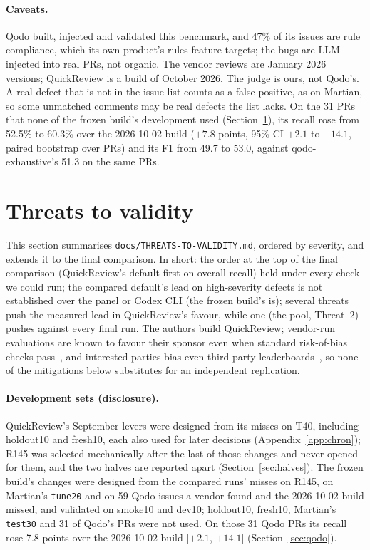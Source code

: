 \documentclass[11pt,a4paper]{article}
\newcommand{\qcr}{QuickReview}
\newcommand{\code}[1]{\texttt{#1}}
\begin{document}
\paragraph{Caveats.} Qodo built, injected and validated this benchmark, and
47\% of its issues are rule compliance, which its own product's rules
feature targets; the bugs are LLM-injected into real PRs, not organic. The
vendor reviews are January 2026 versions; \qcr{} is a build of October 2026.
The judge is ours, not Qodo's. A real defect that is not in the issue list
counts as a false positive, as on Martian, so some unmatched comments may be
real defects the list lacks. On the 31 PRs that none of the frozen build's
development used (Section~\ref{sec:threats}), its recall rose from 52.5\% to 60.3\% over
the 2026-10-02 build ($+7.8$ points, 95\% CI $+2.1$ to $+14.1$, paired
bootstrap over PRs) and its F1 from 49.7 to 53.0, against qodo-exhaustive's
51.3 on the same PRs.

\section{Threats to validity}
\label{sec:threats}

This section summarises \code{docs/THREATS-TO-VALIDITY.md}, ordered by
severity, and extends it to the final comparison. In short: the order at the
top of the final comparison (\qcr{}'s default first on overall recall) held
under every check we could run; the compared default's lead on high-severity
defects is not established over the panel or Codex CLI (the frozen build's
is); several threats push the measured lead in \qcr{}'s favour, while one
(the pool, Threat~2) pushes against every final run. The authors build \qcr{}; vendor-run evaluations
are known to favour their sponsor even when standard risk-of-bias checks
pass~\cite{lundh2017,deepsourcebench}, and interested parties bias even
third-party leaderboards~\cite{singh2025leaderboard}, so none of the
mitigations below substitutes for an independent replication.

\paragraph{Development sets (disclosure).} \qcr{}'s September levers were
designed from its misses on T40, including holdout10 and fresh10, each also
used for later decisions (Appendix~\ref{app:chron}); R145 was selected
mechanically after the last of those changes and never opened for them, and
the two halves are reported apart (Section~\ref{sec:halves}). The frozen
build's changes were designed from the compared runs' misses on R145, on
Martian's \code{tune20} and on 59 Qodo issues a vendor found and the
2026-10-02 build missed, and validated on smoke10 and dev10; holdout10,
fresh10, Martian's \code{test30} and 31 of Qodo's PRs were not used. On
those 31 Qodo PRs its recall rose 7.8 points over the 2026-10-02 build
[$+2.1$, $+14.1$] (Section~\ref{sec:qodo}).
\end{document}

